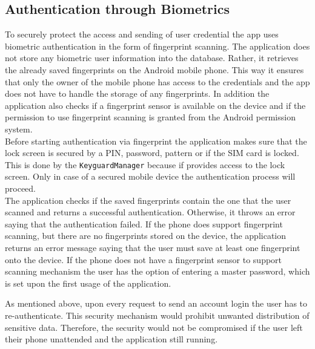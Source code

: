 \subsection{Authentication through Biometrics}
To securely protect the access and sending of user credential the app uses biometric authentication in the form of fingerprint scanning. The application does not store any biometric user information into the database. Rather, it retrieves the already saved fingerprints on the Android mobile phone. This way it ensures that only the owner of the mobile phone has access to the credentials and the app does not have to handle the storage of any fingerprints. In addition the application also checks if a fingerprint sensor is available on the device and if the permission to use fingerprint scanning is granted from the Android permission system. \\ %
Before starting authentication via fingerprint the application makes sure that the lock screen is secured by a PIN, password, pattern or if the SIM card is locked. This is done by the \texttt{KeyguardManager} because if provides access to the lock screen. Only in case of a secured mobile device the authentication process will proceed. \\

The application checks if the saved fingerprints contain the one that the user scanned and returns a successful authentication. Otherwise, it throws an error saying that the authentication failed.  If the phone does support fingerprint scanning, but there are no fingerprints stored on the device, the application returns an error message saying that the user must save at least one fingerprint onto the device. If the phone does not have a fingerprint sensor to support scanning mechanism the user has the option of entering a master password, which is set upon the first usage of the application. 

As mentioned above, upon every request to send an account login the user has to re-authenticate. This security mechanism would prohibit unwanted distribution of sensitive data. Therefore, the security would not be compromised if the user left their phone unattended and the application still running.



